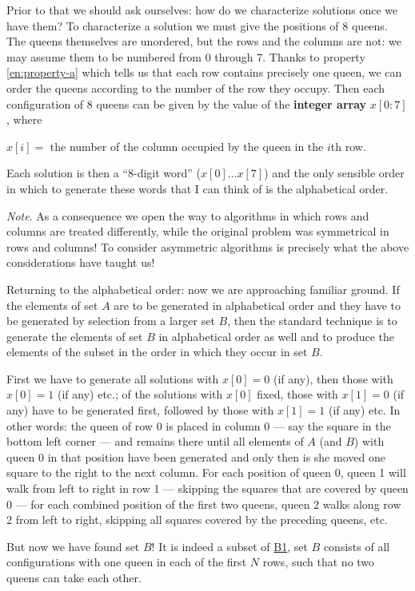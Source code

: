 Prior to that we should ask ourselves: how do we characterize solutions once we have them? To characterize a solution we must give the positions of 8 queens. The queens themselves are unordered, but the rows and the columns are not: we may assume them to be numbered from 0 through 7. Thanks to property \ref{en:property-a} which tells us that each row contains precisely one queen, we can order the queens according to the number of the row they occupy. Then each configuration of 8 queens can be given by the value of the \textbf{integer array} $x[0:7]$, where

\noindent
$x[i] =$ the number of the column occupied by the queen in the $i$th row.

Each solution is then a ``8-digit word'' ($x[0] \dots x[7]$) and the only sensible order in which to generate these words that I can think of is the alphabetical order.

\noindent
\textit{Note}. As a consequence we open the way to algorithms in which rows and columns are treated differently, while the original problem was symmetrical in rows and columns! To consider asymmetric algorithms is precisely what the above considerations have taught us!

Returning to the alphabetical order: now we are approaching familiar ground. If the elements of set $A$ are to be generated in alphabetical order and they have to be generated by selection from a larger set $B$, then the standard technique is to generate the elements of set $B$ in alphabetical order as well and to produce the elements of the subset in the order in which they occur in set $B$.

First we have to generate all solutions with $x[0] = 0$ (if any), then those with $x[0] = 1$ (if any) etc.; of the solutions with $x[0]$ fixed, those with $x[1] = 0$ (if any) have to be generated first, followed by those with $x[1] = 1$ (if any) etc. In other words: the queen of row 0 is placed in column 0 --- say the square in the bottom left corner --- and remains there until all elements of $A$ (and $B$) with queen 0 in that position have been generated and only then is she moved one square to the right to the next column. For each position of queen 0, queen 1 will walk from left to right in row 1 --- skipping the squares that are covered by queen 0 --- for each combined position of the first two queens, queen 2 walks along row 2 from left to right, skipping all squares covered by the preceding queens, etc.

But now we have found set $B$! It is indeed a subset of \hyperref[en:b1-eight-queens]{B1}, set $B$ consists of all configurations with one queen in each of the first $N$ rows, such that no two queens can take each other.

